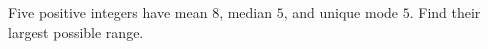 Five positive integers have mean $8$, median $5$, and unique mode $5$. Find their largest possible range.
